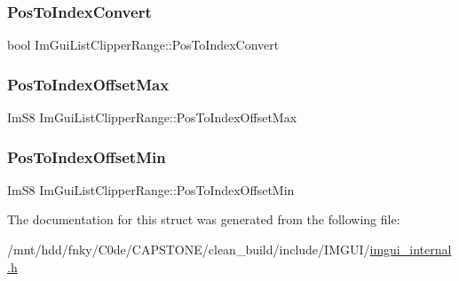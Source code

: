 \subsubsection{\texorpdfstring{Pos\+To\+Index\+Convert}{PosToIndexConvert}}
{\footnotesize\ttfamily bool Im\+Gui\+List\+Clipper\+Range\+::\+Pos\+To\+Index\+Convert}

\mbox{\label{structImGuiListClipperRange_a263e4c13cf54c0f5c402af04f3e84a30}} 
\subsubsection{\texorpdfstring{Pos\+To\+Index\+Offset\+Max}{PosToIndexOffsetMax}}
{\footnotesize\ttfamily Im\+S8 Im\+Gui\+List\+Clipper\+Range\+::\+Pos\+To\+Index\+Offset\+Max}

\mbox{\label{structImGuiListClipperRange_a7ea08ac3ce07bf99b1579ef29d911dba}} 
\subsubsection{\texorpdfstring{Pos\+To\+Index\+Offset\+Min}{PosToIndexOffsetMin}}
{\footnotesize\ttfamily Im\+S8 Im\+Gui\+List\+Clipper\+Range\+::\+Pos\+To\+Index\+Offset\+Min}



The documentation for this struct was generated from the following file\+:\begin{DoxyCompactItemize}
\item 
/mnt/hdd/fnky/\+C0de/\+C\+A\+P\+S\+T\+O\+N\+E/clean\+\_\+build/include/\+I\+M\+G\+U\+I/\hyperlink{imgui__internal_8h}{imgui\+\_\+internal.\+h}\end{DoxyCompactItemize}
